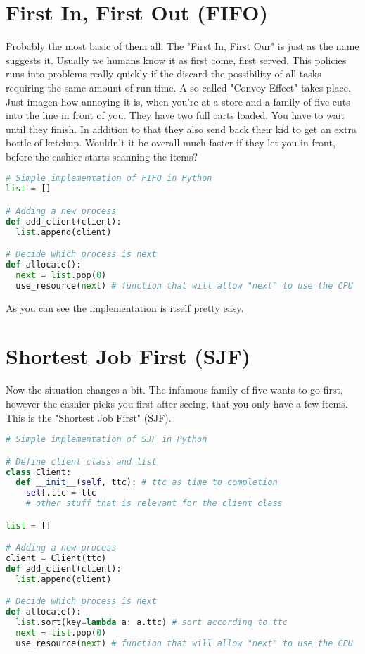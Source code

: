 \documentclass{report}
\begin{document}
\section{First In, First Out (FIFO)}

Probably the most basic of them all.
The "First In, First Our" is just as the name suggests it. 
Usually we humans know it as first come, first served. 
This policies runs into problems really quickly if the discard the possibility of all tasks requiring the same amount of run time. 
A so called "Convoy Effect" takes place. 
Just imagen how annoying it is, when you're at a store and a family of five cuts into the line in front of you. 
They have two full carts loaded. You have to wait until they finish. 
In addition to that they also send back their kid to get an extra bottle of ketchup. 
Wouldn't it be overall much faster if they let you in front, before the cashier starts scanning the items?

\begin{lstlisting}[language=Python, style=colorEX]
# Simple implementation of FIFO in Python
list = []

# Adding a new process
def add_client(client):
  list.append(client)

# Decide which process is next
def allocate():
  next = list.pop(0)
  use_resource(next) # function that will allow "next" to use the CPU
\end{lstlisting}

As you can see the implementation is itself pretty easy.
\pagebreak

\section{Shortest Job First (SJF)}

Now the situation changes a bit. 
The infamous family of five wants to go first, however the cashier picks you first after seeing, that you only have a few items.
This is the "Shortest Job First" (SJF). 

\begin{lstlisting}[language=Python, style=colorEX]
# Simple implementation of SJF in Python

# Define client class and list
class Client:
  def __init__(self, ttc): # ttc as time to completion
    self.ttc = ttc
    # other stuff that is relevant for the client class

list = []

# Adding a new process
client = Client(ttc) 
def add_client(client): 
  list.append(client)

# Decide which process is next
def allocate():
  list.sort(key=lambda a: a.ttc) # sort according to ttc
  next = list.pop(0)
  use_resource(next) # function that will allow "next" to use the CPU
\end{lstlisting}
\end{document}
